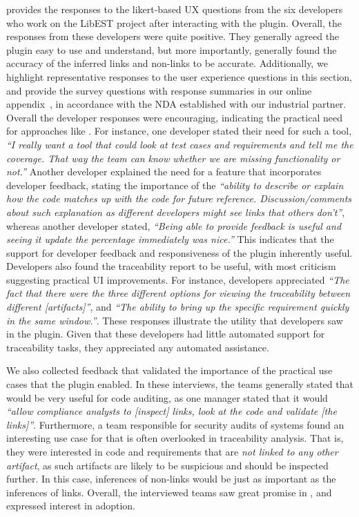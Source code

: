  provides the responses to the likert-based UX questions from the six developers who work on the LibEST project after interacting with the \Comet plugin. Overall, the responses from these developers were quite positive. They generally agreed the \Comet plugin easy to use and understand, but more importantly, generally found the accuracy of the inferred links and non-links to be accurate. Additionally, we highlight representative responses to the user experience questions in this section, and provide the survey questions with response summaries in our online appendix~\citep{appendix}, in accordance with the NDA established with our industrial partner. Overall the developer responses were encouraging, indicating the practical need for approaches like \Comet. For instance, one developer stated their need for such a tool, \textit{``I really want a tool that could look at test cases and requirements and tell me the coverage. That way the team can know whether we are missing functionality or not.''} Another developer explained the need for a feature that incorporates developer feedback, stating the importance of the \textit{``ability to describe or explain how the code matches up with the code for future reference. Discussion/comments about such explanation as different developers might see links that others don't''}, whereas another developer stated, \textit{``Being able to provide feedback is useful and seeing it update the percentage immediately was nice.''}  This indicates that the support for developer feedback and responsiveness of the \Comet plugin inherently useful. Developers also found the traceability report to be useful, with most criticism suggesting practical UI improvements. For instance, developers appreciated \textit{``The fact that there were the three different options for viewing the traceability between different [artifacts]''}, and \textit{``The ability to bring up the specific requirement quickly in the same window.''}. These responses illustrate the utility that developers saw in the \Comet plugin. Given that these developers had little automated support for traceability tasks, they appreciated any automated assistance. 

We also collected feedback that validated the importance of the practical use cases that the \Comet plugin enabled. In these interviews, the teams generally stated that \Comet would be very useful for code auditing, as one manager stated that it would \textit{``allow compliance analysts to [inspect] links, look at the code and validate [the links]''}. Furthermore, a team responsible for security audits of systems found an interesting use case for \Comet that is often overlooked in traceability analysis. That is, they were interested in code and requirements that are \textit{not linked to any other artifact}, as such artifacts are likely to be suspicious and should be inspected further. In this case, \Comets inferences of non-links would be just as important as the inferences of links. Overall, the interviewed teams saw great promise in \Comet, and expressed interest in adoption.